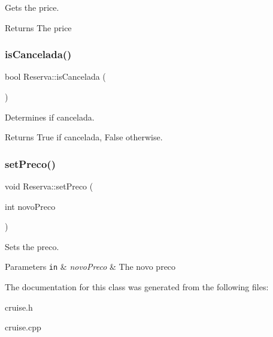 Gets the price. 

\begin{DoxyReturn}{Returns}
The price 
\end{DoxyReturn}
\mbox{\label{classReserva_a1fb3e7e1dfce5960dc888ac9929f014f}} 
\subsubsection{\texorpdfstring{is\+Cancelada()}{isCancelada()}}
{\footnotesize\ttfamily bool Reserva\+::is\+Cancelada (\begin{DoxyParamCaption}{ }\end{DoxyParamCaption})\hspace{0.3cm}{\ttfamily [inline]}}



Determines if cancelada. 

\begin{DoxyReturn}{Returns}
True if cancelada, False otherwise. 
\end{DoxyReturn}
\mbox{\label{classReserva_ac2d3c756eb1abc03f0661cc97e1600e6}} 
\subsubsection{\texorpdfstring{set\+Preco()}{setPreco()}}
{\footnotesize\ttfamily void Reserva\+::set\+Preco (\begin{DoxyParamCaption}\item[{int}]{novo\+Preco }\end{DoxyParamCaption})\hspace{0.3cm}{\ttfamily [inline]}}



Sets the preco. 


\begin{DoxyParams}[1]{Parameters}
\mbox{\tt in}  & {\em novo\+Preco} & The novo preco \\
\hline
\end{DoxyParams}


The documentation for this class was generated from the following files\+:\begin{DoxyCompactItemize}
\item 
cruise.\+h\item 
cruise.\+cpp\end{DoxyCompactItemize}
